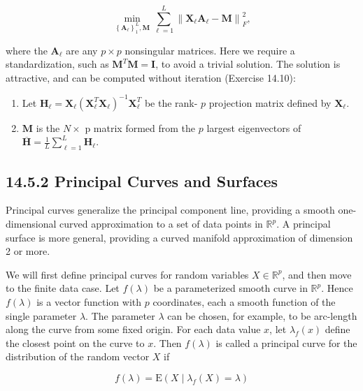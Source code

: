 \documentclass[10pt]{article}
\begin{document}
\begin{equation*}
\min _{\left\{\mathbf{A}_{\ell}\right\}_{1}^{L}, \mathbf{M}} \sum_{\ell=1}^{L}\left\|\mathbf{X}_{\ell} \mathbf{A}_{\ell}-\mathbf{M}\right\|_{F}^{2}, \tag{14.60}
\end{equation*}


where the $\mathbf{A}_{\ell}$ are any $p \times p$ nonsingular matrices. Here we require a standardization, such as $\mathbf{M}^{T} \mathbf{M}=\mathbf{I}$, to avoid a trivial solution. The solution is attractive, and can be computed without iteration (Exercise 14.10):

\begin{enumerate}
  \item Let $\mathbf{H}_{\ell}=\mathbf{X}_{\ell}\left(\mathbf{X}_{\ell}^{T} \mathbf{X}_{\ell}\right)^{-1} \mathbf{X}_{\ell}^{T}$ be the rank- $p$ projection matrix defined by $\mathbf{X}_{\ell}$.
  \item $\mathbf{M}$ is the $N \times$ p matrix formed from the $p$ largest eigenvectors of $\overline{\mathbf{H}}= \frac{1}{L} \sum_{\ell=1}^{L} \mathbf{H}_{\ell}$.
\end{enumerate}

\subsection*{14.5.2 Principal Curves and Surfaces}
Principal curves generalize the principal component line, providing a smooth one-dimensional curved approximation to a set of data points in $\mathbb{R}^{p}$. A principal surface is more general, providing a curved manifold approximation of dimension 2 or more.

We will first define principal curves for random variables $X \in \mathbb{R}^{p}$, and then move to the finite data case. Let $f(\lambda)$ be a parameterized smooth curve in $\mathbb{R}^{p}$. Hence $f(\lambda)$ is a vector function with $p$ coordinates, each a smooth function of the single parameter $\lambda$. The parameter $\lambda$ can be chosen, for example, to be arc-length along the curve from some fixed origin. For each data value $x$, let $\lambda_{f}(x)$ define the closest point on the curve to $x$. Then $f(\lambda)$ is called a principal curve for the distribution of the random vector $X$ if


\begin{equation*}
f(\lambda)=\mathrm{E}\left(X \mid \lambda_{f}(X)=\lambda\right) \tag{14.61}
\end{equation*}
\end{document}

